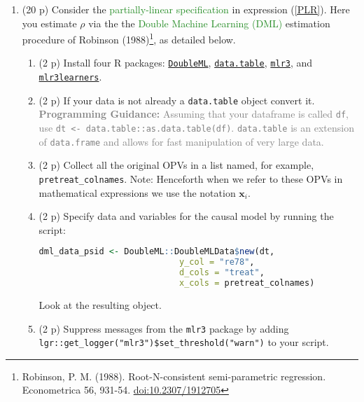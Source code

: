 \documentclass{article}
\begin{document}
\begin{enumerate}[label=\textbf{Q\arabic{enumi}}.,ref=Q\arabic{enumi}, wide=0pt, itemsep=0em, topsep=5pt, labelindent=0pt, resume]
\begin{enumerate}
\end{enumerate}



\item (20 p) Consider the \textcolor{ForestGreen}{partially-linear specification} in expression (\ref{PLR}). Here you estimate $\rho$ via the the \textcolor{ForestGreen}{Double Machine Learning (DML)} estimation procedure of Robinson (1988)\footnote{Robinson, P. M. (1988). Root-N-consistent semi-parametric regression. Econometrica 56, 931-54. \href{https://doi.org/10.2307/1912705}{doi:10.2307/1912705}}, as detailed below.\label{item:DML}
\begin{enumerate}
\item (2 p) Install four R packages: \href{https://docs.doubleml.org/stable/intro/install.html#r-installing-doubleml}{\texttt{DoubleML}}, \href{https://cran.r-project.org/web/packages/data.table/vignettes/datatable-intro.html}{\texttt{data.table}}, \href{https://mlr3.mlr-org.com/}{\texttt{mlr3}}, and \href{https://mlr3learners.mlr-org.com/}{\texttt{mlr3learners}}.
\item (2 p) If your data is not already a \texttt{data.table} object convert it. \textcolor{gray}{\textbf{Programming Guidance:} Assuming that your dataframe is called \texttt{df}, use \texttt{dt <- data.table::as.data.table(df)}. \texttt{data.table} is an extension of \texttt{data.frame} and allows for fast manipulation of very large data.}
\item (2 p) Collect all the original OPVs in a list named, for example, \texttt{pretreat\_colnames}. Note: Henceforth when we refer to these OPVs in mathematical expressions we use the notation $\mathbf{x}_{i}$.
\item (2 p) Specify data and variables for the causal model by running the script:\label{item:dml-data}
\begin{lstlisting}[language=R]
dml_data_psid <- DoubleML::DoubleMLData$new(dt,
                            y_col = "re78",
                            d_cols = "treat",
                            x_cols = pretreat_colnames)
\end{lstlisting}
Look at the resulting object.
\item (2 p) Suppress messages from the \texttt{mlr3} package by adding \texttt{lgr::get\_logger("mlr3")\$set\_threshold("warn")} to your script.

\end{enumerate}
\end{enumerate}
\end{document}
